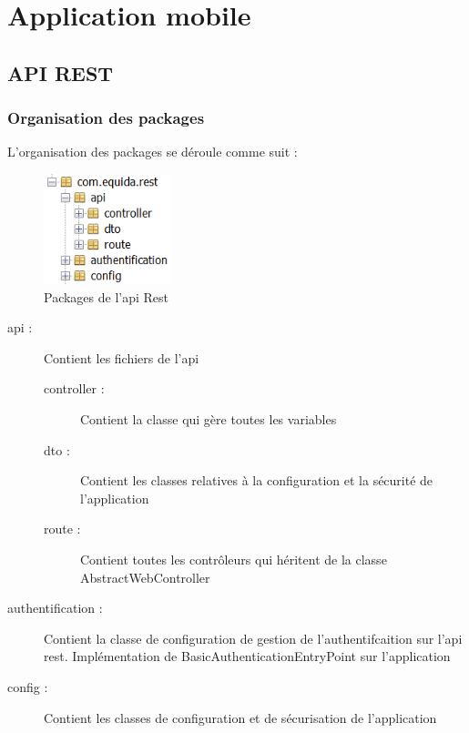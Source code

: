 \chapter{Application mobile}

	\section{API REST}

		\subsection{Organisation des packages}

			L'organisation des packages se déroule comme suit :

			\begin{figure}[H]
				\centering\includegraphics[width=0.33\textwidth, keepaspectratio]{res/package.png}
				\caption{Packages de l'api Rest}
			\end{figure}

			\begin{description}
				\item[api :]{Contient les fichiers de l'api}
				\begin{description}
					\item[controller :]{Contient la classe qui gère toutes les variables}
					\item[dto :]{Contient les classes relatives à la configuration et la sécurité de l'application}
					\item[route :]{Contient toutes les contrôleurs qui héritent de la classe AbstractWebController}
				\end{description}
				\item[authentification :]{Contient la classe de configuration de gestion de l'authentifcaition sur l'api rest. Implémentation de BasicAuthenticationEntryPoint sur l'application}
				\item[config :]{Contient les classes de configuration et de sécurisation de l'application}
			\end{description}

